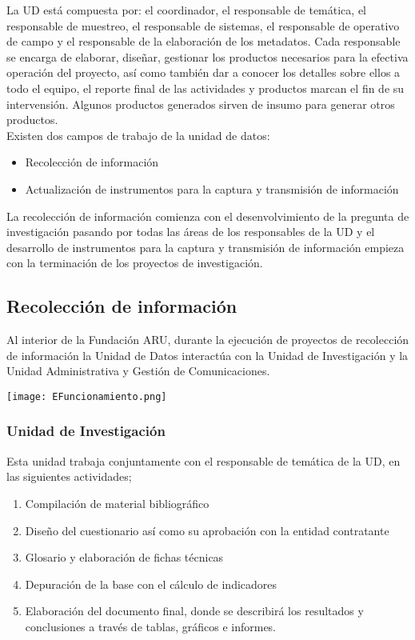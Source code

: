 \documentclass{article}
\begin{document}
La UD está compuesta por: el coordinador, el responsable de temática, el responsable de muestreo, el responsable de sistemas, el responsable de operativo de campo y el responsable de la elaboración de los metadatos. Cada responsable se encarga de elaborar, diseñar, gestionar los productos necesarios para la efectiva operación del proyecto,  así como también dar a conocer los detalles sobre ellos a todo el equipo, el reporte final de las actividades y productos  marcan el fin de su intervensión. Algunos productos generados  sirven de insumo para generar otros productos.\\

Existen dos campos de trabajo de la unidad de datos:

\begin{itemize}
\item Recolección de información 
\item Actualización de instrumentos para la captura y transmisión de información
\end{itemize}

La recolección de información comienza con el desenvolvimiento de la pregunta de investigación pasando por todas las áreas de los responsables de la UD y el desarrollo de instrumentos para la captura y transmisión de información empieza con la terminación de los proyectos de investigación.

\subsection{Recolección de información}

Al interior de la Fundación ARU, durante la ejecución de proyectos de recolección de información la Unidad de Datos interactúa con la Unidad de Investigación y la Unidad Administrativa y Gestión de Comunicaciones.

\begin{center}
\texttt{[image: EFuncionamiento.png]}
\end{center}

\subsubsection{Unidad de Investigación}

Esta unidad trabaja conjuntamente con el responsable de temática de la UD, en las siguientes actividades; 

\begin{enumerate}
\item Compilación de material bibliográfico
\item Diseño del cuestionario así como su aprobación con la entidad contratante
\item Glosario y elaboración de fichas técnicas
\item Depuración de la base con el cálculo de indicadores
\item Elaboración del documento final, donde se describirá los resultados y conclusiones a través de tablas, gráficos e informes.
\end{enumerate}
\end{document}
